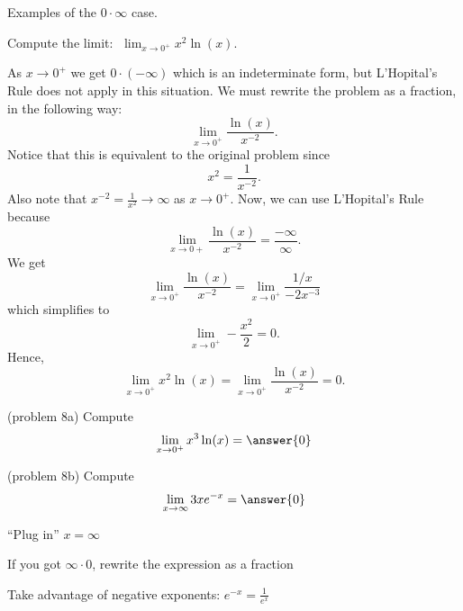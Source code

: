 \documentclass[handout]{ximera}
\begin{document}
Examples of the $0\cdot\infty$ case.

\begin{example}[example 8]
Compute the limit:  $\displaystyle{\;\lim_{x \to 0^+}x^2 \ln(x)}$.

As $x\to 0^+$ we get $0 \cdot (-\infty)$ which is an indeterminate form, but L'Hopital's Rule does not apply in this situation.
We must rewrite the problem as a fraction, in the following way:
\[\lim_{x \to 0^+}\frac{\ln(x)}{x^{-2}}.\]
Notice that this is equivalent to the original problem since 
\[x^2 = \frac{1}{x^{-2}}.\]
Also note that $x^{-2} =\frac{1}{x^2} \to \infty$ as $x\to 0^+$.
Now, we can use L'Hopital's Rule because 
\[\lim_{x \to 0+}\frac{\ln(x)}{x^{-2}}= \frac{-\infty}{\infty}.\]
We get
\[\lim_{x \to 0^+}\frac{\ln(x)}{x^{-2}}= \lim_{x\to 0^+} \frac{1/x}{-2x^{-3}}\]
which simplifies to
\[\lim_{x \to 0^+}-\frac{x^2}{2}= 0.\]
Hence, 
\[\lim_{x \to 0^+} x^2 \ln(x)=\lim_{x \to 0^+}\frac{\ln(x)}{x^{-2}}= 0.\]
\end{example}


\begin{problem}(problem 8a)
  Compute
  \[
  \lim_{x \to 0^+} x^3\ln(x) = \answer{0}
  \]
  
\end{problem}



\begin{problem}(problem 8b)
  Compute
  \[
  \lim_{x \to \infty} 3xe^{-x} = \answer{0}
  \]
  
    \begin{hint}
      ``Plug in'' $x=\infty$
    \end{hint}
    \begin{hint}
      If you got $\infty \cdot 0$, rewrite the expression as a fraction
    \end{hint}
    \begin{hint}
      Take advantage of negative exponents: $e^{-x} = \frac{1}{e^x}$
    \end{hint}
	
\end{problem}


\begin{center}
\begin{foldable}
\end{foldable}
\end{center}
\end{document}
